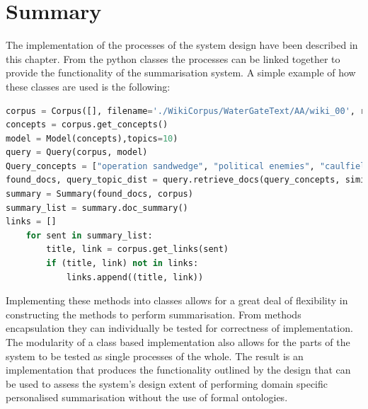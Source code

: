 \section{Summary}
The implementation of the processes of the system design have been described in this chapter. From the python classes the processes can be linked together to provide the functionality of the summarisation system. A simple example of how these classes are used is the following:

\begin{lstlisting}[language=Python]
corpus = Corpus([], filename='./WikiCorpus/WaterGateText/AA/wiki_00', regen=False)
concepts = corpus.get_concepts()
model = Model(concepts),topics=10)
query = Query(corpus, model)
Query_concepts = ["operation sandwedge", "political enemies", "caulfield"]
found_docs, query_topic_dist = query.retrieve_docs(query_concepts, similarity=0.80, query_len=20)
summary = Summary(found_docs, corpus)
summary_list = summary.doc_summary()
links = []
    for sent in summary_list:
        title, link = corpus.get_links(sent)
        if (title, link) not in links:
            links.append((title, link)) 
\end{lstlisting}

Implementing these methods into classes allows for a great deal of flexibility in constructing the methods to perform summarisation. From methods encapsulation they can individually be tested for correctness of implementation. The modularity of a class based implementation also allows for the parts of the system to be tested as single processes of the whole. The result is an implementation that produces the functionality outlined by the design that can be used to assess the system’s design extent of performing domain specific personalised summarisation without the use of formal ontologies.
